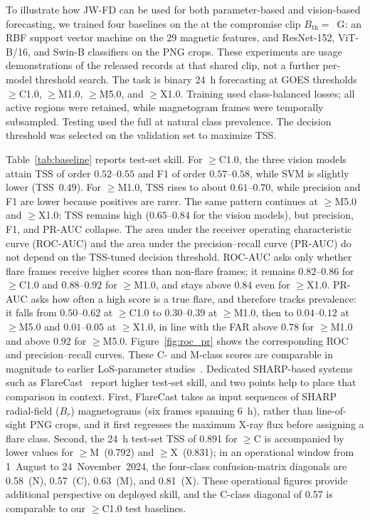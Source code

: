 \documentclass[universe,article,submit,moreauthors]{Definitions/mdpi}
\newif\ifrevision
\newcommand{\add}[1]{\ifrevision\textcolor{blue}{#1}\else#1\fi}
\newcommand{\del}[1]{\ifrevision\textcolor{red}{\sout{#1}}\else\fi}
\newcommand{\chg}[2]{\del{#1}\add{#2}}
\begin{document}
To illustrate how JW-FD can be used for both parameter-based and vision-based forecasting, we trained four baselines on the \chg{seed-62 AR-level assignment}{seed~3970 AR-level assignment} at the compromise clip $B_{\mathrm{th}}={}$\chg{1000}{800}~G: an RBF support vector machine on the 29 magnetic features, and ResNet-152, ViT-B/16, and Swin-B classifiers on the PNG crops. These experiments are usage demonstrations of the released records at that shared clip, not a further per-model threshold search. The task is binary 24~h forecasting at GOES thresholds $\geq$C1.0, $\geq$M1.0, $\geq$M5.0, and $\geq$X1.0. Training used class-balanced losses; all active regions were retained, while magnetogram frames were temporally subsampled. Testing used the full \chg{204{,}920-frame seed-62 test partition}{test partition} at natural class prevalence. The decision threshold was selected on the validation set to maximize TSS. \del{These scores are an internal reference on the initial random split. They will be replaced once the same four models are retrained on the released 19-AR assignment (test 206,079 frames).}

Table~\ref{tab:baseline} reports test-set skill. For $\geq$C1.0, the three vision models attain TSS of order $0.52$--$0.55$ and F1 of order $0.57$--$0.58$, while SVM is slightly lower (TSS~$0.49$). For $\geq$M1.0, TSS rises to about $0.61$--$0.70$, while precision and F1 are lower because positives are rarer. The same pattern continues at $\geq$M5.0 and $\geq$X1.0: TSS remains high ($0.65$--$0.84$ for the vision models), but precision, F1, and PR-AUC collapse. The area under the receiver operating characteristic curve (ROC-AUC) and the area under the precision--recall curve (PR-AUC) do not depend on the TSS-tuned decision threshold. ROC-AUC asks only whether flare frames receive higher scores than non-flare frames; it remains $0.82$--$0.86$ for $\geq$C1.0 and $0.88$--$0.92$ for $\geq$M1.0, and stays above $0.84$ even for $\geq$X1.0. PR-AUC asks how often a high score is a true flare, and therefore tracks prevalence: it falls from $0.50$--$0.62$ at $\geq$C1.0 to $0.30$--$0.39$ at $\geq$M1.0, then to $0.04$--$0.12$ at $\geq$M5.0 and $0.01$--$0.05$ at $\geq$X1.0, in line with the FAR above $0.78$ for $\geq$M1.0 and above $0.92$ for $\geq$M5.0. \add{Figure~\ref{fig:roc_pr} shows the corresponding ROC and precision--recall curves.} These C- and M-class scores are comparable in magnitude to earlier LoS-parameter studies~\cite{AlGhraibah2015}. Dedicated SHARP-based systems such as FlareCast~\cite{Lv2026} report higher test-set skill, and two points help to place that comparison in context. First, FlareCast takes as input sequences of SHARP radial-field ($B_r$) magnetograms (six frames spanning 6~h), rather than line-of-sight PNG crops, and it first regresses the maximum X-ray flux before assigning a flare class. Second, the 24~h test-set TSS of 0.891 for $\geq$C is accompanied by lower values for $\geq$M~(0.792) and $\geq$X~(0.831); in an operational window from 1~August to 24~November~2024, the four-class confusion-matrix diagonals are 0.58~(N), 0.57~(C), 0.63~(M), and 0.81~(X). These operational figures provide additional perspective on deployed skill, and the C-class diagonal of 0.57 is comparable to our $\geq$C1.0 test baselines.
\end{document}
